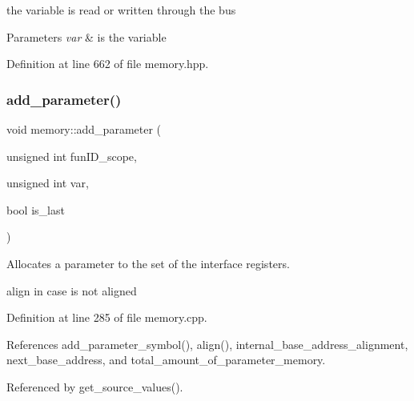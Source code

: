 the variable is read or written through the bus 


\begin{DoxyParams}{Parameters}
{\em var} & is the variable \\
\hline
\end{DoxyParams}


Definition at line 662 of file memory.\+hpp.

\mbox{\label{classmemory_a6857ec6eab958a0a108f12c6e28d994b}} 
\subsubsection{\texorpdfstring{add\+\_\+parameter()}{add\_parameter()}}
{\footnotesize\ttfamily void memory\+::add\+\_\+parameter (\begin{DoxyParamCaption}\item[{unsigned int}]{fun\+I\+D\+\_\+scope,  }\item[{unsigned int}]{var,  }\item[{bool}]{is\+\_\+last }\end{DoxyParamCaption})}



Allocates a parameter to the set of the interface registers. 

align in case is not aligned 

Definition at line 285 of file memory.\+cpp.



References add\+\_\+parameter\+\_\+symbol(), align(), internal\+\_\+base\+\_\+address\+\_\+alignment, next\+\_\+base\+\_\+address, and total\+\_\+amount\+\_\+of\+\_\+parameter\+\_\+memory.



Referenced by get\+\_\+source\+\_\+values().

